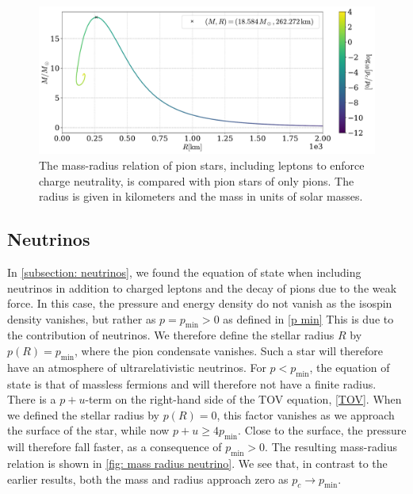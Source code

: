 \begin{figure}[!htb]
    \centering
    \includegraphics[width=.9\textwidth]{../scripts/figurer/pion_star/mass_radius__mu.pdf}
    \caption{
        The mass-radius relation of pion stars, including leptons to enforce charge neutrality, is compared with pion stars of only pions.
        The radius is given in kilometers and the mass in units of solar masses.
        }
        \label{fig: mass-radius relation with muons}
\end{figure}



\subsection{Neutrinos}

In \autoref{subsection: neutrinos}, we found the equation of state when including neutrinos in addition to charged leptons and the decay of pions due to the weak force.
In this case, the pressure and energy density do not vanish as the isospin density vanishes, but rather as $p = p_\text{min}>0$ as defined in \autoref{p min}
This is due to the contribution of neutrinos.
We therefore define the stellar radius $R$ by $p(R) = p_\text{min}$, where the pion condensate vanishes.
Such a star will therefore have an atmosphere of ultrarelativistic neutrinos.
For $p < p_\text{min}$, the equation of state is that of massless fermions and will therefore not have a finite radius.
There is a $p+u$-term on the right-hand side of the TOV equation, \autoref{TOV}.
When we defined the stellar radius by $p(R) = 0$, this factor vanishes as we approach the surface of the star, while now $p+u \geq 4 p_\text{min}$.
Close to the surface, the pressure will therefore fall faster, as a consequence of $p_\text{min}>0$.
The resulting mass-radius relation is shown in \autoref{fig: mass radius neutrino}.
We see that, in contrast to the earlier results, both the mass and radius approach zero as $p_c \rightarrow p_\text{min}$.


